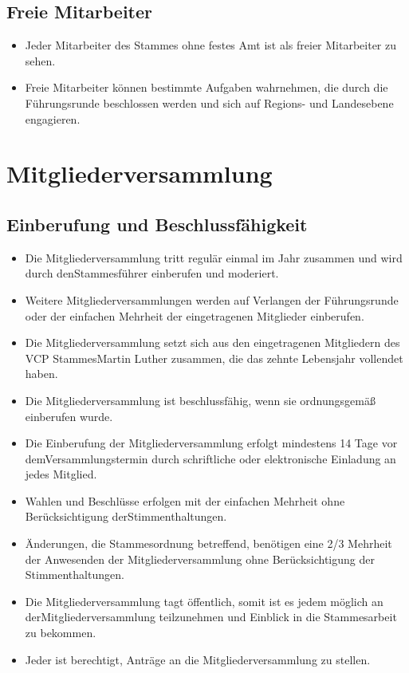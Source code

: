 \documentclass[a4paper]{article}
\begin{document}
    \subsection{Freie Mitarbeiter} %
    \label{sub:freie_mitarbeiter}
	\begin{itemize}
		\item Jeder Mitarbeiter des Stammes ohne festes Amt ist als freier Mitarbeiter zu sehen. 
		\item Freie Mitarbeiter können bestimmte Aufgaben wahrnehmen, die durch die Führungsrunde beschlossen werden und sich auf Regions- und Landesebene engagieren. 
	\end{itemize}


\section{Mitgliederversammlung} %
\label{sec:mitgliederversammlung}

    \subsection{Einberufung und Beschlussfähigkeit} %
    \label{sub:einberufung_und_beschlussfahigkeit}
	\begin{itemize}
        \item Die Mitgliederversammlung tritt regulär einmal im Jahr zusammen und wird durch denStammesführer einberufen und moderiert.
        \item Weitere Mitgliederversammlungen werden auf Verlangen der Führungsrunde oder der einfachen Mehrheit der eingetragenen Mitglieder einberufen.
        \item Die Mitgliederversammlung setzt sich aus den eingetragenen Mitgliedern des VCP StammesMartin Luther zusammen, die das zehnte Lebensjahr vollendet haben.
        \item Die Mitgliederversammlung ist beschlussfähig, wenn sie ordnungsgemäß einberufen wurde.
        \item Die Einberufung der Mitgliederversammlung erfolgt mindestens 14 Tage vor demVersammlungstermin durch schriftliche oder elektronische Einladung an jedes Mitglied.
        \item Wahlen und Beschlüsse erfolgen mit der einfachen Mehrheit ohne Berücksichtigung derStimmenthaltungen.
        \item Änderungen, die Stammesordnung betreffend, benötigen eine 2/3 Mehrheit der Anwesenden der Mitgliederversammlung ohne Berücksichtigung der Stimmenthaltungen.
        \item Die Mitgliederversammlung tagt öffentlich, somit ist es jedem möglich an derMitgliederversammlung teilzunehmen und Einblick in die Stammesarbeit zu bekommen.
        \item Jeder ist berechtigt, Anträge an die Mitgliederversammlung zu stellen.
	\end{itemize}
\end{document}
